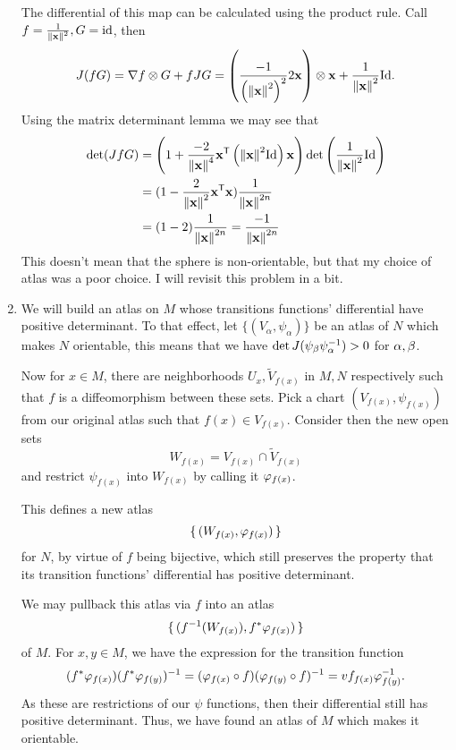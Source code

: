 \documentclass[12pt]{memoir}
\begin{document}
\begin{ptcbr}
\begin{enumerate}
	The differential of this map can be calculated using the product rule. Call $f=\frac{1}{\norm{\mathbf{x}}^2}, G=\operatorname{id}$, then 
	$$J(fG)=\nabla f\otimes G+fJG=\left(\frac{-1}{\left(\norm{\mathbf{x}}^2\right)^2}2\mathbf{x}\right)\otimes\mathbf{x}+\frac{1}{\norm{\mathbf{x}}^2}\mathrm{Id}.$$
	Using the matrix determinant lemma we may see that 
	\begin{align*}
		\det(JfG)&=\left(1+\frac{-2}{\norm{\mathbf{x}}^4}\mathbf{x}^{\mathsf{T}}\left(\norm{\mathbf{x}}^2\mathrm{Id}\right)\mathbf{x}\right)\det\left(\frac{1}{\norm{\mathbf{x}}^2}\mathrm{Id}\right)\\
		&=(1-\frac{2}{\norm{\mathbf{x}}^2}\mathbf{x}^{\mathsf{T}}\mathbf{x})\frac{1}{\norm{\mathbf{x}}^{2n}}\\
		&=(1-2)\frac{1}{\norm{\mathbf{x}}^{2n}}=\frac{-1}{\norm{\mathbf{x}}^{2n}}
	\end{align*}
	This doesn't mean that the sphere is non-orientable, but that my choice of atlas was a poor choice. I will revisit this problem in a bit. %
	\item We will build an atlas on $M$ whose transitions functions' differential have positive determinant. To that effect, let $\{(V_\alpha, \psi_\alpha)\}$ be an atlas of $N$ which makes $N$ orientable, this means that we have $\det J(\psi_\beta \psi_\alpha^{-1})>0$ for $\alpha,\beta$.\par
	Now for $x\in M$, there are neighborhoods $U_x,\widetilde V_{f(x)}$ in $M,N$ respectively such that $f$ is a diffeomorphism between these sets. Pick a chart $(V_{f(x)},\psi_{f(x)})$ from our original atlas such that $f(x)\in V_{f(x)}$. Consider then the new open sets 
	$$W_{f(x)}=V_{f(x)}\cap \widetilde V_{f(x)}$$
	and restrict $\psi_{f(x)}$ into $W_{f(x)}$ by calling it $\varphi_{f(x)}$.\par
	This defines a new atlas
	$$\{\,(W_{f(x)},\varphi_{f(x)})\,\}$$ 
	for $N$, by virtue of $f$ being bijective, which still preserves the property that its transition functions' differential has positive determinant.\par
	We may pullback this atlas via $f$ into an atlas 
	$$\{\,(f^{-1}(W_{f(x)}),f^\ast\varphi_{f(x)})\,\}$$ of $M$. For $x,y\in M$, we have the expression for the transition function
	$$(f^\ast\varphi_{f(x)})(f^\ast\varphi_{f(y)})^{-1}=(\varphi_{f(x)}\circ f)(\varphi_{f(y)}\circ f)^{-1}=vf_{f(x)}\varphi_{f(y)}^{-1}.$$
	As these are restrictions of our $\psi$ functions, then their differential still has positive determinant. Thus, we have found an atlas of $M$ which makes it orientable.
   \end{enumerate}
   \end{ptcbr}
\end{document}
